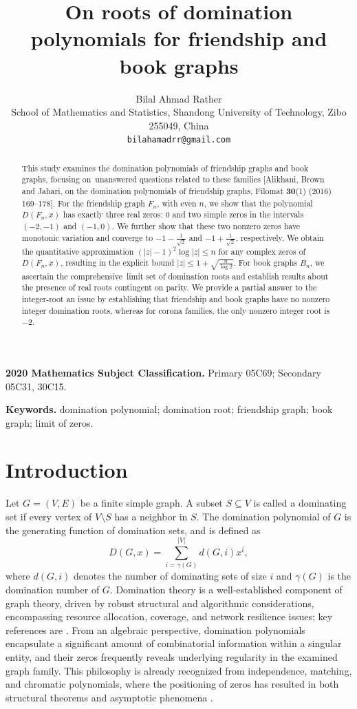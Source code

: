 \documentclass[12pt]{article}
\title{On roots of domination polynomials for friendship and book graphs}
\author{
	{\small Bilal Ahmad Rather}\\[2mm]
	{\small School of Mathematics and Statistics, Shandong University of Technology, Zibo 255049, China}\\
	\texttt{bilahamadrr@gmail.com}
			}
\date{}
\theoremstyle{definition}
\begin{document}
	\maketitle
	
	\begin{abstract}
		This study examines the domination polynomials of friendship graphs and book graphs, focusing on unanswered questions related to these families [Alikhani,  Brown and  Jahari, 	on the domination polynomials of friendship graphs, Filomat \textbf{30}(1) (2016) 169--178]. For the friendship graph $F_n$, with even $n$, we show that the polynomial $D(F_n,x)$ has exactly three real zeros: $0$ and two simple zeros in the intervals $(-2,-1)$ and $(-1,0)$. We further show that these two nonzero zeros have monotonic variation and converge to $-1-\frac{1}{\sqrt2}$ and $-1+\frac{1}{\sqrt2}$, respectively. We obtain the quantitative approximation $(|z|-1)^2\log |z|\le n$ for any complex zeros of $D(F_n,x)$, resulting in the explicit bound $|z|\le 1+\sqrt{\tfrac{n}{\log 2}}$. For book graphs $B_n$, we ascertain the comprehensive limit set of domination roots and establish results about the presence of real roots contingent on parity. We provide a partial answer to the integer-root an issue by establishing that friendship and book graphs have no nonzero integer domination roots, whereas for corona families, the only nonzero integer root is $-2$.
	\end{abstract}
	
	\noindent\textbf{2020 Mathematics Subject Classification.} Primary 05C69; Secondary 05C31, 30C15.
	
	\medskip
	
	\noindent\textbf{Keywords.} domination polynomial; domination root; friendship graph; book graph; limit of zeros.
	
	\section{Introduction}
	
	Let $G=(V,E)$ be a finite simple graph. A subset $S\subseteq V$ is called a dominating set if every vertex of $V\setminus S$ has a neighbor in $S$. The domination polynomial of $G$ is the generating function of domination sets, and is defined as
	$$
	D(G,x)=\sum_{i=\gamma(G)}^{|V|} d(G,i)x^i,
	$$
	where $d(G,i)$ denotes the number of dominating sets of size $i$ and $\gamma(G)$ is the domination number of $G$. Domination theory is a well-established component of graph theory, driven by robust structural and algorithmic considerations, encompassing resource allocation, coverage, and network resilience issues; key references are \cite{HaynesHedetniemiSlater1998,AlikhaniPeng2014Intro}. From an algebraic perspective, domination polynomials encapsulate a significant amount of combinatorial information within a singular entity, and their zeros frequently reveals underlying regularity in the examined graph family. This philosophy is already recognized from independence, matching, and chromatic polynomials, where the positioning of zeros has resulted in both structural theorems and asymptotic phenomena \cite{BrownDilcherNowakowski2000,BrownNowakowski2001,BrownHickman2002,Comtet1974, BrownTufts2014}.
	
\end{document}
